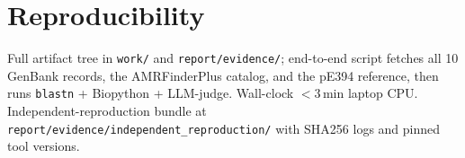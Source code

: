 \documentclass[11pt,letterpaper]{article}
\begin{document}
\section{Reproducibility}
Full artifact tree in \texttt{work/} and \texttt{report/evidence/}; end-to-end script fetches all 10 GenBank records, the AMRFinderPlus catalog, and the pE394 reference, then runs \texttt{blastn} + Biopython + LLM-judge. Wall-clock $<$3\,min laptop CPU. Independent-reproduction bundle at \texttt{report/evidence/independent\_reproduction/} with SHA256 logs and pinned tool versions.
\end{document}

